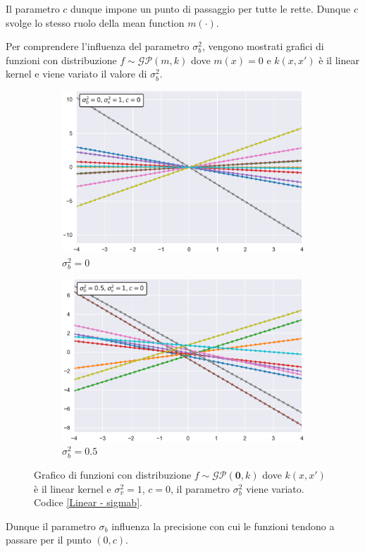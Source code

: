 Il parametro $c$ dunque impone un punto di passaggio per tutte le rette. Dunque $c$ svolge lo stesso ruolo della mean function $m(\cdot)$.

Per comprendere l'influenza del parametro $\sigma_b^2$, vengono mostrati grafici di funzioni con distribuzione $f\sim \mathcal{GP}(m,k)$ dove $m(x)=0$ e $k(x,x')$ è il linear kernel e viene variato il valore di $\sigma_b^2$.

\begin{figure}[h]
\centering
\begin{subfigure}{.5\textwidth}
  \centering
  \includegraphics[width=\linewidth]{images/Gaussian process/Linear - sigmab=0.pdf}
  \caption{$\sigma_b^2=0$}
\end{subfigure}%
\begin{subfigure}{.5\textwidth}
  \centering
  \includegraphics[width=\linewidth]{images/Gaussian process/Linear - sigmab=05.pdf}
  \caption{$\sigma_b^2=0.5$}
\end{subfigure}
\caption{Grafico di funzioni con distribuzione $f\sim \mathcal{GP}(\bm{0},k)$ dove $k(x,x')$ è il linear kernel e $\sigma_v^2=1$, $c=0$, il parametro $\sigma_b^2$ viene variato. Codice \ref{Linear - sigmab}.}
\label{10 sample linear modified sigmab}
\end{figure}
Dunque il parametro $\sigma_b$ influenza la precisione con cui le funzioni tendono a passare per il punto $(0,c)$.

